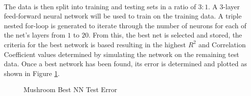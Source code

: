 \documentclass{article}%
\begin{document}
\\
The data is then split into training and testing sets in a ratio of $3:1$. A 3-layer feed-forward neural network will be used to train on the training data. A triple nested for-loop is generated to iterate through the number of neurons for each of the net's layers from $1$ to $20$. From this, the best net is selected and stored, the criteria for the best network is based resulting in the highest $R^2$ and Correlation Coefficient values determined by simulating the network on the remaining test data. Once a best network has been found, its error is determined and plotted as shown in Figure \ref{fig:mushtrain}.
\begin{figure}[H]
\centering
\caption{Mushroom Best NN Test Error}
\label{fig:mushtrain}
\end{figure}
\end{document}
